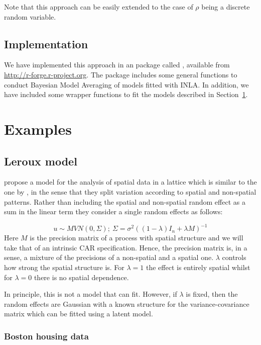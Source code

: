 \documentclass[article]{jss}
\begin{document}
Note that this approach can be easily extended to the case of $\rho$ being
a discrete random variable.


\subsection{Implementation}

We have implemented this approach in an  package called ,
available from \url{http://r-forge.r-project.org}. The package includes some
general functions to conduct Bayesian Model Averaging of models fitted with
INLA. In addition, we have included some wrapper functions to fit the models
described in Section~\ref{sec:examples}.


\section{Examples}
\label{sec:examples}

\subsection{Leroux model}

\citet{Lerouxetal:1999} propose a model for the analysis of spatial data in a
lattice which is similar to the one by \citet{besagetal:1991}, in the sense
that they split variation according to  spatial and non-spatial patterns.
Rather than including the spatial and non-spatial random effect as a sum in the
linear term they consider a single random effects as follows:

\begin{equation}
u \sim MVN(0, \Sigma);\ \Sigma=\sigma^2 ((1-\lambda) I_n+\lambda M)^{-1}
\label{eq:leroux}
\end{equation}
\noindent
Here $M$ is the precision matrix of a process with spatial structure and we
will take that of an intrinsic CAR specification. Hence, the precision matrix
is, in a sense, a mixture of the precisions of a non-spatial and a spatial
one. $\lambda$ controls how strong the spatial structure is. For $\lambda=1$
the effect is entirely spatial whilst for $\lambda=0$ there is no spatial
dependence.

In principle, this is not a model that  can fit. However, if
$\lambda$ is fixed, then the random effects are Gaussian with a known structure
for the variance-covariance matrix which can be fitted using a 
latent model.

\subsubsection{Boston housing data}
\end{document}

